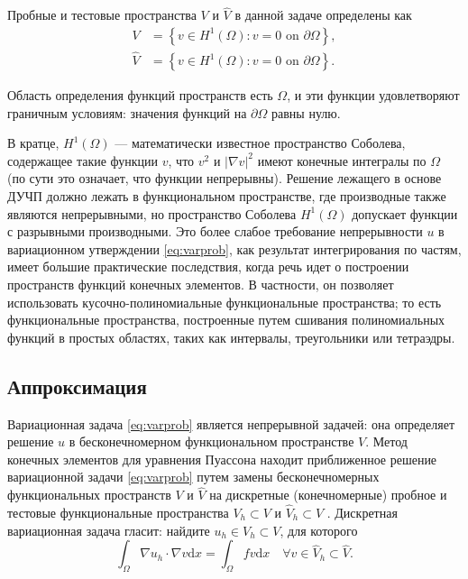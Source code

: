 Пробные и тестовые пространства ${V}$ и ${\hat V}$ в данной задаче определены как
\begin{align}
V &= \left\{v \in H^{1}(\Omega): v=0 \text { on } \partial \Omega\right\}, \\
\hat{V} &= \left\{v \in H^{1}(\Omega): v=0 \text { on } \partial \Omega\right\}.
\end{align}

Область определения функций пространств есть ${\Omega}$,
и эти функции удовлетворяют граничным условиям:
значения функций на ${\partial\Omega}$ равны нулю.

В кратце, ${H^1(\Omega)}$ --- математически известное пространство Соболева, содержащее такие функции ${v}$, что ${v^2}$ и ${|\nabla v|^2}$ имеют конечные интегралы по ${\Omega}$ (по сути это означает, что функции непрерывны). Решение лежащего в основе ДУЧП должно лежать в функциональном пространстве, где производные также являются непрерывными, но пространство Соболева ${H^1(\Omega)}$ допускает функции с разрывными производными. Это более слабое требование непрерывности ${u}$ в вариационном утверждении \eqref{eq:varprob}, как результат интегрирования по частям, имеет большие практические последствия, когда речь идет о построении пространств функций конечных элементов. В частности, он позволяет использовать кусочно-полиномиальные функциональные пространства; то есть функциональные пространства, построенные путем сшивания полиномиальных функций в простых областях, таких как интервалы, треугольники или тетраэдры.


\subsection{Аппроксимация}

Вариационная задача \eqref{eq:varprob} является непрерывной задачей: она определяет решение ${u}$ в бесконечномерном функциональном пространстве ${V}$. Метод конечных элементов для уравнения Пуассона находит приближенное решение вариационной задачи \eqref{eq:varprob} путем замены бесконечномерных функциональных пространств ${V}$ и ${\hat V}$ на дискретные (конечномерные) пробное и тестовые функциональные пространства ${V_h \subset V}$ и ${\hat V_h \subset \hat V}$ \cite[с. 14]{FEniCS}. Дискретная вариационная задача гласит: найдите ${u_h \in V_h \subset V}$, для которого
\begin{equation} \label{eq:varprob_approx}
\int_{\Omega} \nabla u_{h} \cdot \nabla v \mathrm{d} x=\int_{\Omega} f v \mathrm{d} x \quad \forall v \in \hat{V}_{h} \subset \hat{V}.
\end{equation}

